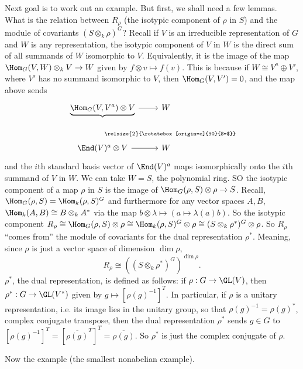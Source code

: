 Next goal is to work out an example. But first, we shall need a few lemmas. What is the relation between $R_\rho$ (the isotypic component of $\rho$ in $S$) and the module of covariants $(S \otimes_k \rho)^G$? Recall if $V$ is an irreducible representation of $G$ and $W$ is any representation, the isotypic component of $V$ in $W$ is the direct sum of all summands of $W$ isomorphic to $V$. Equivalently, it is the image of the map $\Hom_G(V,W) \otimes_k V \to W$ given by $f \otimes v \mapsto f(v)$. This is because if $W \cong V^a \oplus V'$, where $V'$ has no summand isomorphic to $V$, then $\Hom_G(V,V')=0$, and the map above sends 
	\[
	\begin{tikzcd}
	\underbrace{\Hom_G(V,V^a) \otimes V}_{} \arrow[draw=none]{d}{\relsize{2}{\rotatebox[origin=c]{90}{$=$}}} \arrow{r} & W \\
	\End(V)^a \otimes V \arrow{r} & W
	\end{tikzcd}
	\]
and the $i$th standard basis vector of $\End(V)^a$ maps isomorphically onto the $i$th summand of $V$ in $W$. We can take $W=S$, the polynomial ring. SO the isotypic component of a map $\rho$ in $S$ is the image of $\Hom_G(\rho,S) \otimes \rho \to S$. Recall, $\Hom_G(\rho,S) = \Hom_k(\rho,S)^G$ and furthermore for any vector spaces $A,B$, $\Hom_k(A,B) \cong B \otimes_k A^*$ via the map $b \otimes \lambda \mapsto (a \mapsto \lambda(a)b)$. So the isotypic component $R_\rho \cong \Hom_G(\rho,S) \otimes \rho \cong \Hom_k(\rho,S)^G \otimes \rho \cong (S \otimes_k \rho^*)^G \otimes \rho$. So $R_\rho$ ``comes from'' the module of covariants for the dual representation $\rho^*$. Meaning, since $\rho$ is just a vector space of dimension $\dim \rho$,
	\[
	R_\rho \cong ( (S \otimes_k \rho^*)^G )^{\dim \rho}.
	\]
$\rho^*$, the dual representation, is defined as follows: if $\rho: G \to \GL(V)$, then $\rho^*: G \to \GL(V^*)$ given by $g \mapsto [\rho(g)^{-1}]^T$. In particular, if $\rho$ is a unitary representation, i.e. its image lies in the unitary group, so that $\rho(g)^{-1}= \rho(g)^*$, complex conjugate transpose, then the dual representation $\rho^*$ sends $g \in G$ to $[\rho(g)^{-1}]^T= [\overline{\rho(g)}^T]^T= \overline{\rho(g)}$. So $\rho^*$ is just the complex conjugate of $\rho$. 



Now the example (the smallest nonabelian example). 


